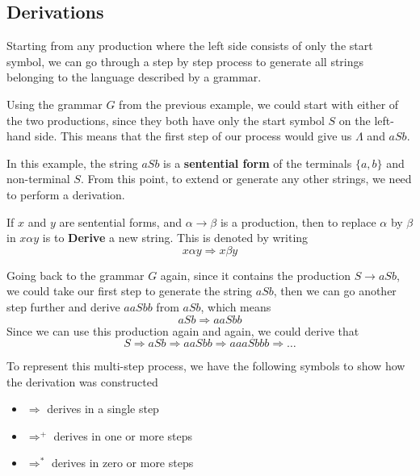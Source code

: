 \subsection*{Derivations}

Starting from any production where the left side consists of only the start symbol, we can go through a step by step
 process to generate all strings belonging to the language described by a grammar.

\begin{example*}{}{}
  Using the grammar $G$ from the previous example, we could start with either of the two productions, since they both
   have only the start symbol $S$ on the left-hand side. This means that the first step of our process would give us
   $\Lambda$ and $aSb$.
\end{example*}

In this example, the string $aSb$ is a \textbf{sentential form} of the terminals $\{a, b\}$ and non-terminal $S$. From
 this point, to extend or generate any other strings, we need to perform a derivation.

\begin{definition*}{}{}
  If $x$ and $y$ are sentential forms, and $\alpha \rightarrow \beta$ is a production, then to replace $\alpha$ by
   $\beta$ in $x \alpha y$ is to \textbf{Derive} a new string. This is denoted by writing
  \begin{equation*}
    x \alpha y \Rightarrow x \beta y
  \end{equation*}
\end{definition*}

\begin{example*}{}{}
  Going back to the grammar $G$ again, since it contains the production $S \rightarrow aSb$, we could take our first
   step to generate the string $aSb$, then we can go another step further and derive $aaSbb$ from $aSb$, which means
  \begin{equation*}
    aSb \Rightarrow aaSbb
  \end{equation*}
  Since we can use this production again and again, we could derive that
  \begin{equation*}
    S \Rightarrow aSb \Rightarrow aaSbb \Rightarrow aaaSbbb \Rightarrow \ldots
  \end{equation*}
\end{example*}

To represent this multi-step process, we have the following symbols to show how the derivation was constructed
\begin{itemize}
  \item $\Rightarrow$ derives in a single step
  \item $\Rightarrow^+$ derives in one or more steps
  \item $\Rightarrow^*$ derives in zero or more steps
\end{itemize}

